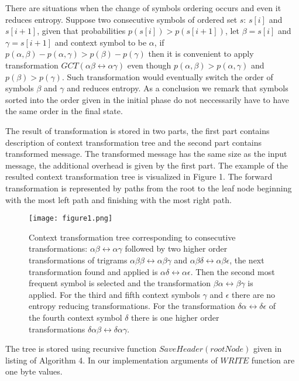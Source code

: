 \documentclass[smallabstract,smallcaptions]{dccpaper}
\begin{document}
There are situations when the change of symbols ordering occurs and even it reduces entropy. Suppose two consecutive symbols of ordered set $s$: $s[i]$ and $s[i+1]$, given that probabilities  $p(s[i])>p(s[i+1])$, let $\beta=s[i]$ and $\gamma=s[i+1]$ and context symbol to be $\alpha$, if $p(\alpha,\beta) - p(\alpha, \gamma) > p(\beta) - p(\gamma)$ then it is convenient to apply transformation $GCT(\alpha\beta\leftrightarrow\alpha\gamma)$ even though $p(\alpha,\beta)>p(\alpha,\gamma)$ and $p(\beta)>p(\gamma)$. Such transformation would eventually switch the order of symbols $\beta$ and $\gamma$ and reduces entropy. As a conclusion we remark that symbols sorted into the order given in the initial phase do not neccessarily have to have the same order in the final state.

The result of transformation is stored in two parts, the first part contains description of context transformation tree and the second part contains transformed message. The transformed message has the same size as the input message, the additional overhead is given by the first part. The example of the resulted context transformation tree is visualized in Figure 1. The forward transformation is represented by paths from the root to the leaf node beginning with the most left path and finishing with the most right path.

\begin{figure}[ht!]
\centering
\texttt{[image: figure1.png]}
\caption{\label{fig:3t}%
Context transformation tree corresponding to consecutive transformations: $\alpha\beta\leftrightarrow\alpha\gamma$ followed by two higher order transformations of trigrams $\alpha\beta\beta\leftrightarrow\alpha\beta\gamma$ and $\alpha\beta\delta\leftrightarrow\alpha\beta\epsilon$, the next transformation found and applied is $\alpha\delta\leftrightarrow\alpha\epsilon$. Then the second most frequent symbol is selected and the transformation $\beta\alpha\leftrightarrow\beta\gamma$ is applied. For the third and fifth context symbols $\gamma$ and $\epsilon$ there are no entropy reducing transformations. For the transformation $\delta\alpha\leftrightarrow\delta\epsilon$ of the fourth context symbol $\delta$ there is one higher order transformations $\delta\alpha\beta\leftrightarrow\delta\alpha\gamma$.}
\label{fig_sim}
\end{figure}

The tree is stored using recursive function $SaveHeader(rootNode)$ given in listing of Algorithm 4. In our implementation arguments of $WRITE$ function are one byte values.
\end{document}
